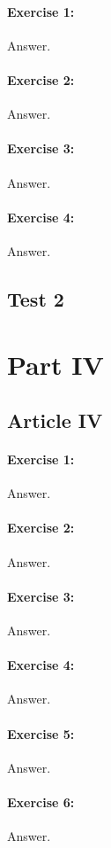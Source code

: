 \documentclass{article}
\begin{document}
\paragraph{Exercise 1:}
Answer.
\paragraph{Exercise 2:}
Answer.
\paragraph{Exercise 3:}
Answer.
\paragraph{Exercise 4:}
Answer.
\newpage

\subsection*{Test 2}
\newpage

\section*{Part IV}

\subsection*{Article IV}
\paragraph{Exercise 1:}
Answer.
\paragraph{Exercise 2:}
Answer.
\paragraph{Exercise 3:}
Answer.
\paragraph{Exercise 4:}
Answer.
\paragraph{Exercise 5:}
Answer.
\paragraph{Exercise 6:}
Answer.
\end{document}
